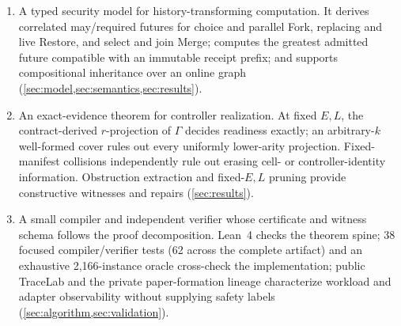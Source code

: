 \begin{enumerate}[leftmargin=*,itemsep=2pt]
  \item A typed security model for history-transforming computation.  It derives
  correlated may/required futures for choice and parallel Fork, replacing and
  live Restore, and select and join Merge; computes the greatest admitted future
  compatible with an immutable receipt prefix; and supports compositional
  inheritance over an online graph
  (\cref{sec:model,sec:semantics,sec:results}).

  \item An exact-evidence theorem for controller realization.  At fixed $E,L$,
  the contract-derived $r$-projection of $\Gamma$ decides readiness exactly;
  an arbitrary-$k$ well-formed cover rules out every uniformly lower-arity
  projection.  Fixed-manifest collisions independently rule out erasing cell-
  or controller-identity information.  Obstruction extraction and fixed-$E,L$
  pruning provide constructive witnesses and repairs
  (\cref{sec:results}).

  \item A small compiler and independent verifier whose certificate and witness
  schema follows the proof decomposition.  Lean~4 checks the theorem spine;
  38 focused compiler/verifier tests (62 across the complete artifact) and an
  exhaustive 2,166-instance oracle cross-check the implementation; public
  TraceLab and the private paper-formation lineage
  characterize workload and adapter observability without supplying safety
  labels (\cref{sec:algorithm,sec:validation}).
\end{enumerate}
